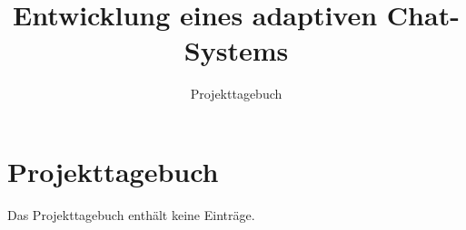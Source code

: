 \documentclass[accentcolor=tud0b,12pt,paper=a4]{tudreport}
\title{Entwicklung eines adaptiven Chat-Systems}
\subtitle{Projekttagebuch}
\begin{document}
  \maketitle

  \chapter{Projekttagebuch}
  Das Projekttagebuch enthält keine Einträge.
\end{document}
